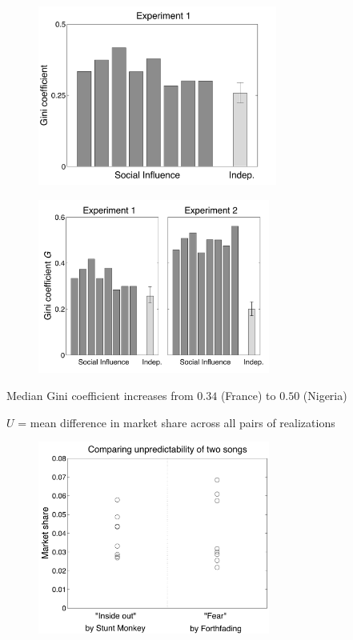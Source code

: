 \documentclass[aspectratio=169]{beamer}
\begin{document}
\begin{frame}

\begin{figure}
  \centering
  \includegraphics[width=0.7\textwidth]{figures/gini_v1_unordered_ci}
\end{figure}

\end{frame}
\begin{frame}

\begin{figure}
  \centering
  \includegraphics[width=3in]{figures/compare_gini_v1v2_unordered_ci}
\end{figure}

Median Gini coefficient increases from $0.34$ (France) to $0.50$ (Nigeria)
\end{frame}

\begin{frame}

$U$ = mean difference in market share across all pairs of realizations\\
\begin{figure}
  \centering
  \includegraphics[width = 3in]{figures/arbitrary_example}
\end{figure}

\end{frame}
\end{document}
